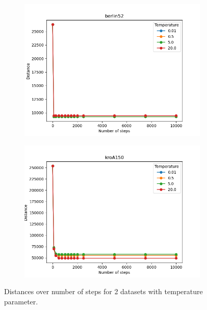 \begin{figure}[!htb]
	\centering
	\begin{subfigure}{0.45\textwidth}
		\includegraphics[width=\textwidth]{img/berlin52_temperature}
	\end{subfigure}
	\begin{subfigure}{0.45\textwidth}
		\includegraphics[width=\textwidth]{img/kroA150_temperature}
	\end{subfigure}
	\caption{Distances over number of steps for 2 datasets with temperature parameter.}
	\label{fig:temperature_1}
\end{figure}

